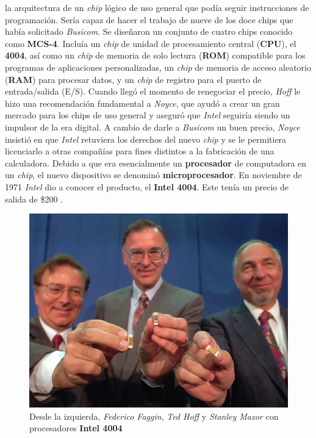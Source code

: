 la arquitectura de un \emph{chip} lógico de uso general que podía seguir instrucciones de programación. Sería capaz de hacer el trabajo de
nueve de los doce chips que había solicitado \emph{Busicom}. Se diseñaron un conjunto de cuatro chips conocido como \textbf{MCS-4}. Incluía un
\emph{chip} de unidad de procesamiento central (\textbf{CPU}), el \textbf{4004}, así como un \emph{chip} de memoria de solo lectura
(\textbf{ROM}) compatible para los programas de aplicaciones personalizadas, un \emph{chip} de memoria de acceso aleatorio (\textbf{RAM})
para procesar datos, y un \emph{chip} de registro para el puerto de entrada/salida (E/S). Cuando llegó el momento de renegociar el precio,
\emph{Hoff} le hizo una recomendación fundamental a \emph{Noyce}, que ayudó a crear un gran mercado para los chips de uso general y aseguró que
\emph{Intel} seguiría siendo un impulsor de la era digital. A cambio de darle a \emph{Busicom} un buen precio, \emph{Noyce} insistió en que
\emph{Intel} retuviera los derechos del nuevo \emph{chip} y se le permitiera licenciarlo a otras compañías para fines distintos a la
fabricación de una calculadora. Debido a que era esencialmente un \textbf{procesador} de computadora en un \emph{chip}, el nuevo dispositivo se
denominó \textbf{microprocesador}. En noviembre de 1971 \emph{Intel} dio a conocer el producto, el \textbf{Intel 4004}.
Este tenía un precio de salida de \$200 .

\begin{figure}[htb]
	\centering
	\includegraphics[scale = 0.25]{Graphics/faggin_hoff_mazor_-4004.jpg}
	\caption{Desde la izquierda, \emph{Federico Faggin}, \emph{Ted Hoff} y \emph{Stanley Mazor} con procesadores \textbf{Intel 4004}}
	\label{fig:10}
\end{figure}

